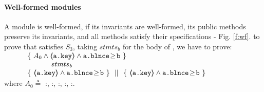 {{\paragraph{Well-formed modules} A module is well-formed, if  its invariants are well-formed,    its public methods preserve   its invariants, and  all  methods satisfy their specifications - \cf  Fig.  \ref{f:wf}.
%
%
%
\Eg to prove  that   satisfies {$S_3$}, taking   $stmts_{b}$ %
for the    body of ,  we  have to prove:
\\
$
\begin{array}{ll}
\ \ \ \ \  &   
                     \{ \ {A_0  \wedge  \inside{\prg{a.\password}} \wedge  \prg{a.\balance}\!\geq\!{\prg{b} } } \  \} \\
		& \ \ \ \ \ \ \ \ \ \   stmts_{b} \  \\
		&
                   \{\  {\inside{\prg{a.\password}} \wedge  \prg{a.\balance}\!\geq\!{\prg{b}} }  \ \}\ \  ||\ \  \{\ \inside{\prg{a.\password}}\wedge  \prg{a.\balance}\!\geq\!{\prg{b}}   \ \} 
\end{array}
$
\\
\noindent 
 where $A_0 \triangleq $ %
:, :, :, :,  :.


}}

